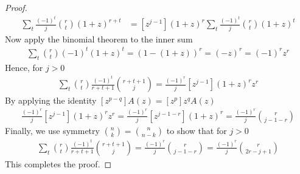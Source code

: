 \begin{lemma}
\begin{proof}
        \begin{align*}
            [z^{j-1}] \sum_t \frac{(-1)^t}{j} \binom{r}{t} (1+z)^{r+t}
            &= [z^{j-1}] (1+z)^r \sum_t \frac{(-1)^t}{j} \binom{r}{t} (1+z)^t
        \end{align*}
        Now apply the binomial theorem to the inner sum
        \begin{align*}
            \sum_t \binom{r}{t} (-1)^t (1+z)^t = \left(1 - (1+z)\right)^r = (-z)^r = (-1)^r z^r
        \end{align*}
        Hence, for $j>0$
        \begin{align*}
            \sum_t \binom{r}{t} \frac{(-1)^t}{r+t+1} \binom{r+t+1}{j} = \frac{(-1)^r}{j} [z^{j-1}] (1+z)^r z^r
        \end{align*}
        By applying the identity $[z^{p-q}]A(z)=[z^p]z^qA(z)$
        \begin{align*}
            \frac{(-1)^r}{j}  [z^{j-1}] (1+z)^r z^r = \frac{(-1)^r}{j}  [z^{j-1-r}] (1+z)^r = \frac{(-1)^r}{j} \binom{r}{j - 1 - r}
        \end{align*}
        Finally, we use symmetry $\binom{n}{k} = \binom{n}{n-k}$ to show that for $j > 0$
        \begin{align*}
            \sum_t \binom{r}{t} \frac{(-1)^t}{r+t+1} \binom{r+t+1}{j} = \frac{(-1)^r}{j} \binom{r}{j - 1 - r} = \frac{(-1)^r}{j} \binom{r}{2r - j + 1}
        \end{align*}
        This completes the proof.
    \end{proof}
\end{lemma}


